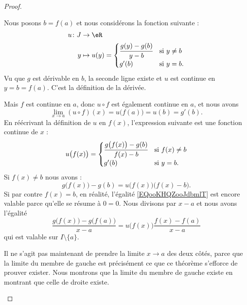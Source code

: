 \begin{proof}
\begin{subproof}
		Nous posons \( b=f(a)\) et nous considérons la fonction suivante :
		\begin{equation}
			\begin{aligned}
				u\colon J & \to \eR                                   \\
				y         & \mapsto u(y)=\begin{cases}
					\cfrac{ g(y)-g(b) }{ y-b }  & \text{si } y\neq b  \\
					g'(b)                       & \text{si } y=b.
				\end{cases}
			\end{aligned}
		\end{equation}
		Vu que \( g\) est dérivable en \( b\), la seconde ligne existe et \( u\) est continue en \( y=b=f(a)\). C'est la définition de la dérivée.

		Mais \( f\) est continue en \( a\), donc \( u\circ f\) est également continue en \( a\), et nous avons
		\begin{equation}
			\lim_{x\to a} (u\circ f)(x)=u\big( f(a) \big)=u(b)=g'(b).
		\end{equation}
		En réécrivant la définition de \( u\) en \( f(x)\), l'expression suivante est une fonction continue de \( x\) :
		\begin{equation}
			u\big( f(x) \big)=\begin{cases}
				\cfrac{ g\big( f(x) \big)-g(b) }{ f(x)-b }  & \text{si } f(x)\neq b       \\
				g'(b)                                       & \text{si } y=b.
			\end{cases}
		\end{equation}
		Si \( f(x)\neq b\) nous avons :
		\begin{equation}        \label{EQooKHQZooJdbmlT}
			g\big( f(x) \big)-g(b)=u\big( f(x) \big)\big( f(x)-b \big).
		\end{equation}
		Si par contre \( f(x)=b\), en réalité, l'égalité \eqref{EQooKHQZooJdbmlT} est encore valable parce qu'elle se résume à \( 0=0\). Nous divisons par \( x-a\) et nous avons l'égalité
		\begin{equation}
			\frac{ g\big( f(x) \big)-g\big( f(a) \big) }{ x-a }=u\big( f(x) \big)\frac{ f(x)-f(a) }{ x-a }
		\end{equation}
		qui est valable sur \( I\setminus\{ a \}\).

		Il ne s'agit pas maintenant de prendre la limite \( x\to a\) des deux côtés, parce que la limite du membre de gauche est précisément ce que ce théorème s'efforce de prouver exister. Nous montrons que la limite du membre de gauche existe en montrant que celle de droite existe.


\end{subproof}
\end{proof}
